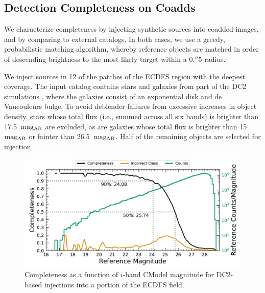 \subsection{Detection Completeness on Coadds}
\label{ssec:detection_completeness}
We characterize completeness by injecting synthetic sources into coadded images, and by comparing to external catalogs.
In both cases, we use a greedy, probabilistic matching algorithm, whereby reference objects are matched in order of descending brightness to the most likely target within a $0.''5$ radius.

We inject sources in 12 of the patches of the ECDFS region with the deepest coverage.
The input catalog contains stars and galaxies from part of the DC2 simulations \citep{2021ApJS..253...31L}, where the galaxies consist of an exponential disk and de Vaucouleurs \citep{1948AnAp...11..247D,1953MNRAS.113..134D} bulge.
To avoid deblender failures from excessive increases in object density, stars whose total flux (i.e., summed across all six bands) is brighter than 17.5~${\rm mag_{\rm AB}}$ are excluded, as are galaxies whose total flux is brighter than 15~${\rm mag_{AB}}$ or fainter than 26.5~${\rm mag_{AB}}$. Half of the remaining objects are selected for injection.

\begin{figure}[htb]
\centering
\includegraphics[width=0.98\linewidth]{figures/injected_lsst_cells_v1_5063_i_completeness_any.pdf}
\caption{Completeness as a function of $i$-band CModel magnitude for DC2-based injections into a portion of the ECDFS field.}
\label{fig:injected_lsst_cells_v1_5063_i_completeness_any}
\vspace{0.1cm}
\end{figure}

